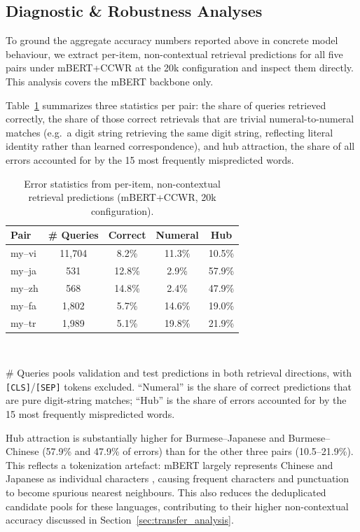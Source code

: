 \documentclass[11pt]{article}
\begin{document}
\subsection{Diagnostic \& Robustness Analyses}
\label{sec:error_analysis}

To ground the aggregate accuracy numbers reported above in concrete model behaviour, we extract per-item, non-contextual retrieval predictions for all five pairs under mBERT+CCWR at the 20k configuration and inspect them directly. This analysis covers the mBERT backbone only.

Table~\ref{tab:cross_pair_errors} summarizes three statistics per pair: the share of queries retrieved correctly, the share of those correct retrievals that are trivial numeral-to-numeral matches (e.g.\ a digit string retrieving the same digit string, reflecting literal identity rather than learned correspondence), and hub attraction, the share of all errors accounted for by the 15 most frequently mispredicted words.

\begin{table}[h]
\centering
\small
\caption{Error statistics from per-item, non-contextual retrieval predictions (mBERT+CCWR, 20k configuration).}
\label{tab:cross_pair_errors}
\begin{tabular}{lcccc}
\toprule
\textbf{Pair} & \textbf{\# Queries} & \textbf{Correct} & \textbf{Numeral} & \textbf{Hub} \\
\midrule
my--vi & 11,704 & 8.2\%  & 11.3\% & 10.5\% \\
my--ja & 531    & 12.8\% & 2.9\%  & 57.9\% \\
my--zh & 568    & 14.8\% & 2.4\%  & 47.9\% \\
my--fa & 1,802  & 5.7\%  & 14.6\% & 19.0\% \\
my--tr & 1,989  & 5.1\%  & 19.8\% & 21.9\% \\
\bottomrule
\end{tabular}
\\[2pt]
\raggedright\footnotesize \# Queries pools validation and test predictions in both retrieval directions, with \texttt{[CLS]}/\texttt{[SEP]} tokens excluded. ``Numeral'' is the share of correct predictions that are pure digit-string matches; ``Hub'' is the share of errors accounted for by the 15 most frequently mispredicted words.
\end{table}

Hub attraction is substantially higher for Burmese--Japanese and Burmese--Chinese (57.9\% and 47.9\% of errors) than for the other three pairs (10.5--21.9\%). This reflects a tokenization artefact: mBERT largely represents Chinese and Japanese as individual characters \citep{devlin-etal-2019-bert}, causing frequent characters and punctuation to become spurious nearest neighbours. This also reduces the deduplicated candidate pools for these languages, contributing to their higher non-contextual accuracy discussed in Section~\ref{sec:transfer_analysis}.
\end{document}
